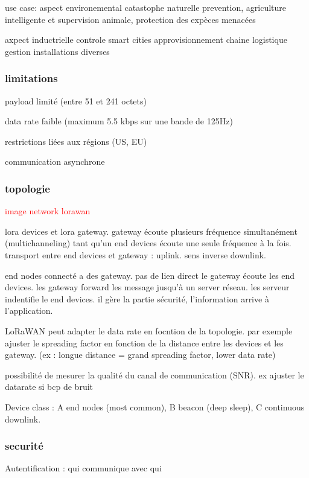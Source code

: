 \documentclass[12pt,a4paper,oneside, titlepage]{report}
\begin{document}
use case:
aspect environemental 
catastophe naturelle prevention,
agriculture intelligente et supervision animale,
protection des expèces menacées

axpect inductrielle
controle smart cities
approvisionnement chaine logistique
gestion installations diverses

\subsubsection{limitations}

payload limité (entre 51 et 241 octets)

data rate faible (maximum 5.5 kbps sur une bande de 125Hz)

restrictions liées aux régions (US, EU)

communication asynchrone 


\subsubsection{topologie}

\textcolor{red}{image network lorawan}

lora devices et lora gateway. gateway écoute plusieurs fréquence simultanément (multichanneling) tant qu'un end devices écoute une seule fréquence à la fois. transport entre end devices et gateway : uplink. sens inverse downlink.


end nodes connecté a des gateway. pas de lien direct le gateway écoute les end devices. les gateway forward les message jusqu'à un server réseau. les serveur indentifie le end devices. il gère la partie sécurité, l'information arrive à l'application.

LoRaWAN peut adapter le data rate en focntion de la topologie. par exemple ajuster le spreading factor en fonction de la distance entre les devices et les gateway. (ex : longue distance = grand spreading factor, lower data rate)

possibilité de mesurer la qualité du canal de communication (SNR). ex ajuster le datarate si bcp de bruit

Device class :
A end nodes (most common), 
B beacon (deep sleep),
C continuous downlink.

\subsubsection{securité}

Autentification : qui communique avec qui
\end{document}
